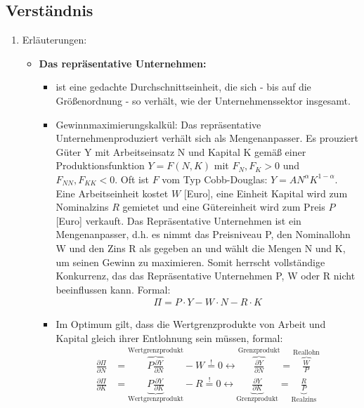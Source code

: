 \documentclass{scrartcl}
\begin{document}
\subsection{Verst\"{a}ndnis}
\begin{enumerate}
  \item Erl\"{a}uterungen:
  \begin{itemize}
  \item \textbf{Das repr\"{a}sentative Unternehmen:}
  \begin{itemize}
    \item ist eine gedachte Durchschnittseinheit, die sich - bis auf die Gr\"{o}{\ss}enordnung - so verh\"{a}lt, wie der Unternehmenssektor insgesamt.
    \item Gewinnmaximierungskalk\"{u}l: Das repr\"{a}sentative Unternehmenproduziert verh\"{a}lt sich als Mengenanpasser. Es prouziert G\"{u}ter Y mit Arbeitseinsatz N und Kapital K gem\"{a}{\ss} einer Produktionsfunktion $Y=F(N,K)$ mit $F_N,F_K >0$ und $F_{NN},F_{KK}<0$. Oft ist $F$ vom Typ Cobb-Douglas: $Y=A N^{\alpha} K^{1-\alpha}$. Eine Arbeitseinheit kostet $W$ [Euro], eine Einheit Kapital wird zum Nominalzins $R$ gemietet und eine G\"{u}tereinheit wird zum Preis $P$ [Euro] verkauft. Das Repr\"{a}sentative Unternehmen ist ein Mengenanpasser, d.h. es nimmt das Preisniveau P, den Nominallohn W und den Zins R als gegeben an und w\"{a}hlt die Mengen N und K, um seinen Gewinn zu maximieren. Somit herrscht vollst\"{a}ndige Konkurrenz, das das Repr\"{a}sentative Unternehmen P, W oder R nicht beeinflussen kann. Formal:
        \begin{align*}
          \Pi = P \cdot Y - W \cdot N - R \cdot K
        \end{align*}
    \item Im Optimum gilt, dass die Wertgrenzprodukte von Arbeit und Kapital gleich ihrer Entlohnung sein m\"{u}ssen, formal:
        \begin{align*}
          \frac{\partial \Pi}{\partial N} &= \overbrace{P \frac{\partial Y}{\partial N}}^{\text{Wertgrenzprodukt}} - W \overset{!}{=} 0 \leftrightarrow \overbrace{\frac{\partial Y}{\partial N}}^\text{Grenzprodukt} = \overbrace{\frac{W}{P}}^\text{Reallohn} \\
          \frac{\partial \Pi}{\partial K} &= \underbrace{P \frac{\partial Y}{\partial K}}_\text{Wertgrenzprodukt} - R \overset{!}{=} 0 \leftrightarrow \underbrace{\frac{\partial Y}{\partial K}}_\text{Grenzprodukt} = \underbrace{\frac{R}{P}}_\text{Realzins}
        \end{align*}

\end{itemize}
\end{itemize}
\end{enumerate}
\end{document}
